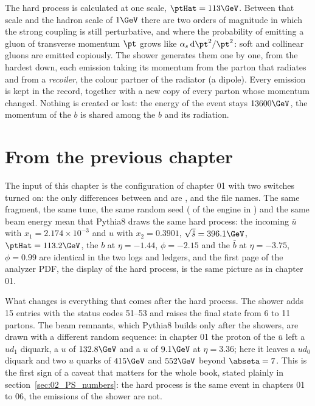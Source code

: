 \begin{plainwords}
The hard process is calculated at one scale, $\ptHat = 113\GeV$. Between that scale and the hadron scale of
$1\GeV$ there are two orders of magnitude in which the strong coupling is still perturbative, and where the
probability of emitting a gluon of transverse momentum $\pt$ grows like $\alpha_s\,\mathrm{d}\pt^2/\pt^2$: soft and
collinear gluons are emitted copiously. The shower generates them one by one, from the hardest down, each emission
taking its momentum from the parton that radiates and from a \emph{recoiler}, the colour partner of the radiator
(a dipole). Every emission is kept in the record, together with a new copy of every parton whose momentum changed.
Nothing is created or lost: the energy of the event stays $13600\GeV$, the momentum of the $b$ is shared among the
$b$ and its radiation.
\end{plainwords}

\section{From the previous chapter}

The input of this chapter is the configuration of chapter 01 with two switches turned on: the only differences
between  and  are
,  and the file names. The same fragment, the same tune, the
same random seed ( of the  engine in
) and the same beam energy mean that Pythia8 draws the same hard process:
the incoming $\bar u$ with $x_1 = 2.174\times10^{-3}$ and $u$ with $x_2 = 0.3901$, $\sqrt{\hat s} = 396.1\GeV$,
$\ptHat = 113.2\GeV$, the $b$ at $\eta = -1.44$, $\phi = -2.15$ and the $\bar b$ at $\eta = -3.75$, $\phi = 0.99$ are
identical in the two logs and ledgers, and the first page of the analyzer PDF, the display of the hard process, is
the same picture as in chapter 01.

What changes is everything that comes after the hard process. The shower adds 15 entries with the status codes
51--53 and raises the final state from 6 to 11 partons. The beam remnants, which Pythia8 builds only after the
showers, are drawn with a different random sequence: in chapter 01 the proton of the $\bar u$ left a $ud_1$ diquark,
a $u$ of $132.8\GeV$ and a $u$ of $9.1\GeV$ at $\eta = 3.36$; here it leaves a $ud_0$ diquark and two $u$ quarks of
$415\GeV$ and $552\GeV$ beyond $\abseta = 7$. This is the first sign of a caveat that matters for the whole
book, stated plainly in section~\ref{sec:02_PS_numbers}: the hard process is the same event in chapters 01 to 06,
the emissions of the shower are not.

